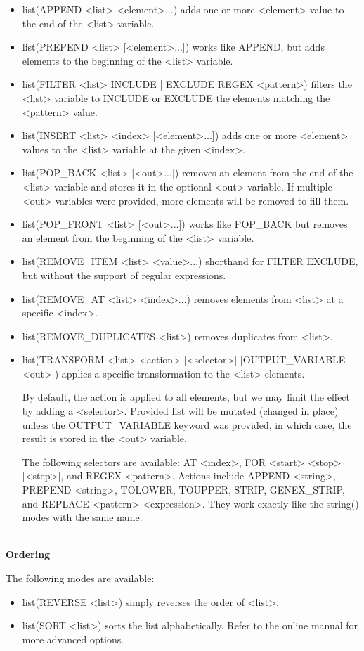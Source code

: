 \begin{itemize}
\item 
list(APPEND <list> <element>...) adds one or more <element> value to the end of the <list> variable.

\item 
list(PREPEND <list> [<element>...]) works like APPEND, but adds elements to the beginning of the <list> variable.

\item 
list(FILTER <list> {INCLUDE | EXCLUDE} REGEX <pattern>) filters the <list> variable to INCLUDE or EXCLUDE the elements matching the <pattern> value.

\item 
list(INSERT <list> <index> [<element>...]) adds one or more <element> values to the <list> variable at the given <index>.

\item 
list(POP\_BACK <list> [<out>...]) removes an element from the end of the <list> variable and stores it in the optional <out> variable. If multiple <out> variables were provided, more elements will be removed to fill them.

\item 
list(POP\_FRONT <list> [<out>...]) works like POP\_BACK but removes an element from the beginning of the <list> variable.

\item 
list(REMOVE\_ITEM <list> <value>...) shorthand for FILTER EXCLUDE, but without the support of regular expressions.

\item 
list(REMOVE\_AT <list> <index>...) removes elements from <list> at a specific <index>.

\item 
list(REMOVE\_DUPLICATES <list>) removes duplicates from <list>.

\item 
list(TRANSFORM <list> <action> [<selector>] [OUTPUT\_VARIABLE <out>]) applies a specific transformation to the <list> elements.

By default, the action is applied to all elements, but we may limit the effect by adding a <selector>. Provided list will be mutated (changed in place) unless the OUTPUT\_VARIABLE keyword was provided, in which case, the result is stored in the <out> variable.

The following selectors are available: AT <index>, FOR <start> <stop> [<step>], and REGEX <pattern>. Actions include APPEND <string>, PREPEND <string>, TOLOWER, TOUPPER, STRIP, GENEX\_STRIP, and REPLACE <pattern> <expression>. They work exactly like the string() modes with the same name.
\end{itemize}


\hspace*{\fill} \\ %
\noindent
\textbf{Ordering}

The following modes are available:

\begin{itemize}
\item 
list(REVERSE <list>) simply reverses the order of <list>.

\item 
list(SORT <list>) sorts the list alphabetically. Refer to the online manual for more advanced options.
\end{itemize}

